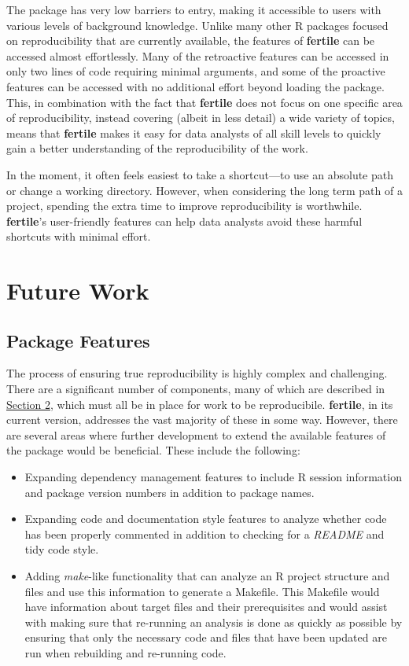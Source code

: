 \documentclass[APA,LATO1COL]{WileyNJD-v2}
\begin{document}
The package has very low barriers to entry, making it accessible to users with various levels of background knowledge. Unlike many other R packages focused on reproducibility that are currently available, the features of \textbf{fertile} can be accessed almost effortlessly. Many of the retroactive features can be accessed in only two lines of code requiring minimal arguments, and some of the proactive features can be accessed with no additional effort beyond loading the package. This, in combination with the fact that \textbf{fertile} does not focus on one specific area of reproducibility, instead covering (albeit in less detail) a wide variety of topics, means that \textbf{fertile} makes it easy for data analysts of all skill levels to quickly gain a better understanding of the reproducibility of the work.

In the moment, it often feels easiest to take a shortcut—to use an absolute path or change a working directory. However, when considering the long term path of a project, spending the extra time to improve reproducibility is worthwhile. \textbf{fertile}'s user-friendly features can help data analysts avoid these harmful shortcuts with minimal effort.

\section{Future Work}\label{sec5}

\subsection{Package Features}

The process of ensuring true reproducibility is highly complex and challenging. There are a significant number of components, many of which are described in \hyperref[sec2]{Section 2}, which must all be in place for work to be reproducibile. \textbf{fertile}, in its current version, addresses the vast majority of these in some way. However, there are several areas where further development to extend the available features of the package would be beneficial. These include the following:

\begin{itemize}
  \item Expanding dependency management features to include R session information and package version numbers in addition to package names.
  \item Expanding code and documentation style features to analyze whether code has been properly commented in addition to checking for a \textit{README} and tidy code style.
  \item Adding \textit{make}-like functionality that can analyze an R project structure and files and use this information to generate a Makefile. This Makefile would have information about target files and their prerequisites and would assist with making sure that re-running an analysis is done as quickly as possible by ensuring that only the necessary code and files that have been updated are run when rebuilding and re-running code.
\end{itemize}
\end{document}
